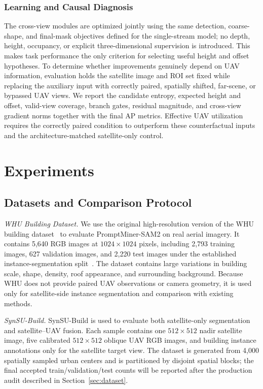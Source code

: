 \documentclass[letterpaper,journal]{IEEEtran}
\begin{document}
\subsubsection{Learning and Causal Diagnosis}
The cross-view modules are optimized jointly using the same detection, coarse-shape, and final-mask objectives defined for the single-stream model; no depth, height, occupancy, or explicit three-dimensional supervision is introduced. This makes task performance the only criterion for selecting useful height and offset hypotheses. To determine whether improvements genuinely depend on UAV information, evaluation holds the satellite image and ROI set fixed while replacing the auxiliary input with correctly paired, spatially shifted, far-scene, or bypassed UAV views. We report the candidate entropy, expected height and offset, valid-view coverage, branch gates, residual magnitude, and cross-view gradient norms together with the final AP metrics. Effective UAV utilization requires the correctly paired condition to outperform these counterfactual inputs and the architecture-matched satellite-only control.

\section{Experiments}
\label{sec:experiments}

\subsection{Datasets and Comparison Protocol}
\label{sec:experimental_datasets}

\noindent\textit{WHU Building Dataset.}
We use the original high-resolution version of the WHU building dataset~\cite{ref_whu} to evaluate PromptMiner-SAM2 on real aerial imagery. It contains 5,640 RGB images at $1024\times1024$ pixels, including 2,793 training images, 627 validation images, and 2,220 test images under the established instance-segmentation split~\cite{ref_p2pformer}. The dataset contains large variations in building scale, shape, density, roof appearance, and surrounding background. Because WHU does not provide paired UAV observations or camera geometry, it is used only for satellite-side instance segmentation and comparison with existing methods.

\noindent\textit{SynSU-Build.}
SynSU-Build is used to evaluate both satellite-only segmentation and satellite--UAV fusion. Each sample contains one $512\times512$ nadir satellite image, five calibrated $512\times512$ oblique UAV RGB images, and building instance annotations only for the satellite target view. The dataset is generated from 4,000 spatially sampled urban centers and is partitioned by disjoint spatial blocks; the final accepted train/validation/test counts will be reported after the production audit described in Section~\ref{sec:dataset}.
\end{document}
